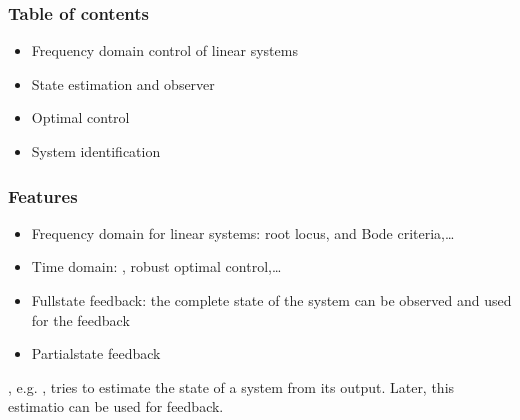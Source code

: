 \documentclass[letterpaper,10pt,english]{jupyterBook}
\begin{document}
\subsubsection*{Table of contents}
\begin{itemize}
\item {} 
\sphinxAtStartPar
Frequency domain control of linear systems

\item {} 
\sphinxAtStartPar
State estimation and observer

\item {} 
\sphinxAtStartPar
Optimal control

\item {} 
\sphinxAtStartPar
System identification

\end{itemize}
\subsubsection*{Features}

\sphinxAtStartPar
{}
\begin{itemize}
\item {} 
\sphinxAtStartPar
Frequency domain for linear systems: root locus,  and Bode criteria,…

\item {} 
\sphinxAtStartPar
Time domain: {\hyperref[\detokenize{ch/control/optimal-control:control-optimal}]{}}, robust optimal control,…

\end{itemize}

\sphinxAtStartPar
{}
\begin{itemize}
\item {} 
\sphinxAtStartPar
Full\sphinxhyphen{}state feedback: the complete state of the system can be observed and used for the feedback

\item {} 
\sphinxAtStartPar
Partial\sphinxhyphen{}state feedback

\end{itemize}

\sphinxAtStartPar
{}, e.g. , tries to estimate the state of a system from its output. Later, this estimatio can be used for feedback.
\end{document}
